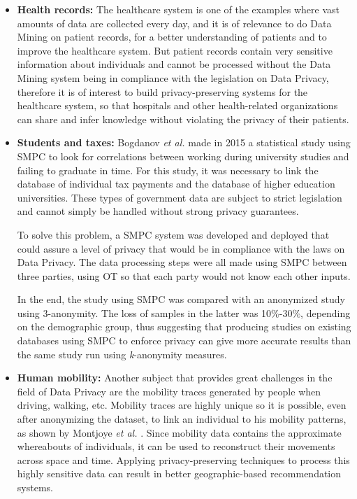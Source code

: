 \begin{itemize}
	\setlength\itemsep{1em}
	\item \textbf{Health records:} The healthcare system is one of the examples where vast amounts of data are collected every day, and it is of relevance to do Data Mining on patient records, for a better understanding of patients and to improve the healthcare system. But patient records contain very sensitive information about individuals and cannot be processed without the Data Mining system being in compliance with the legislation on Data Privacy, therefore it is of interest to build privacy-preserving systems for the healthcare system, so that hospitals and other health-related organizations can share and infer knowledge without violating the privacy of their patients.

	\item \textbf{Students and taxes:} Bogdanov \textit{et al.} \cite{Bogdanov2015} made in 2015 a statistical study using \ac{SMPC} to look for correlations between working during university studies and failing to graduate in time. For this study, it was necessary to link the database of individual tax payments and the database of higher education universities. These types of government data are subject to strict legislation and cannot simply be handled without strong privacy guarantees.

    To solve this problem, a \ac{SMPC} system was developed and deployed that could assure a level of privacy that would be in compliance with the laws on Data Privacy. The data processing steps were all made using \ac{SMPC} between three parties, using \ac{OT} so that each party would not know each other inputs.

    In the end, the study using \ac{SMPC} was compared with an anonymized study using 3-anonymity. The loss of samples in the latter was 10\%-30\%, depending on the demographic group, thus suggesting that producing studies on existing databases using \ac{SMPC} to enforce privacy can give more accurate results than the same study run using \textit{k}-anonymity measures.

	\item \textbf{Human mobility:} Another subject that provides great challenges in the field of Data Privacy are the mobility traces generated by people when driving, walking, etc. Mobility traces are highly unique so it is possible, even after anonymizing the dataset, to link an individual to his mobility patterns, as shown by Montjoye \textit{et al.} \cite{de2013unique}. Since mobility data contains the approximate whereabouts of individuals, it can be used to reconstruct their movements across space and time. Applying privacy-preserving techniques to process this highly sensitive data can result in better geographic-based recommendation systems.
\end{itemize}


